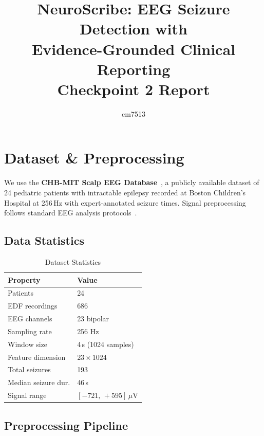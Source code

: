 \documentclass[11pt,twocolumn]{article}
\title{\textbf{NeuroScribe: EEG Seizure Detection with\\
Evidence-Grounded Clinical Reporting}\\[4pt]
\large Checkpoint 2 Report}
\author{cm7513}
\date{}
\begin{document}
\maketitle
\thispagestyle{empty}

\section{Dataset \& Preprocessing}

We use the \textbf{CHB-MIT Scalp EEG Database}~\cite{shoeb2009}, a publicly
available dataset of 24 pediatric patients with intractable epilepsy recorded
at Boston Children's Hospital at 256\,Hz with expert-annotated seizure times.
Signal preprocessing follows standard EEG analysis protocols~\cite{niedermeyer2004}.

\subsection{Data Statistics}

\begin{table}[h]
\centering
\caption{Dataset Statistics}
\small
\begin{tabular}{@{}ll@{}}
\toprule
\textbf{Property} & \textbf{Value} \\
\midrule
Patients           & 24 \\
EDF recordings     & 686 \\
EEG channels       & 23 bipolar \\
Sampling rate      & 256 Hz \\
Window size        & 4\,s (1024 samples) \\
Feature dimension  & $23 \times 1024$ \\
Total seizures     & 193 \\
Median seizure dur.& 46\,s \\
Signal range       & $[-721,\,+595]$\,$\mu$V \\
\bottomrule
\end{tabular}
\label{tab:stats}
\end{table}

\vspace{-6pt}
\subsection{Preprocessing Pipeline}
\end{document}
